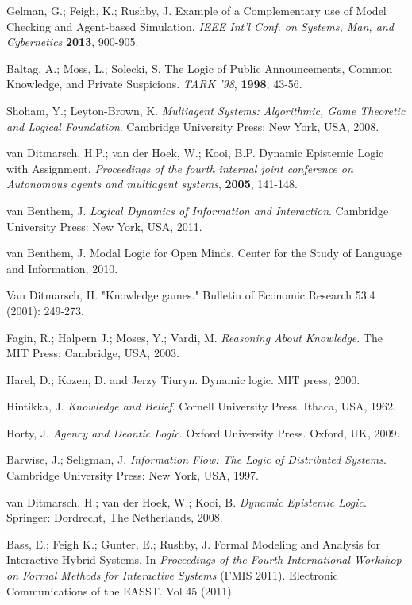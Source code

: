 \begin{thebibliography}{9}
	 	Gelman, G.; Feigh, K.; Rushby, J. Example of a Complementary use of Model Checking and Agent-based Simulation. {\em IEEE Int'l Conf. on Systems, Man, and Cybernetics} {\bf 2013}, 900-905.
	 	
	 	
	 	
	 	Baltag, A.; Moss, L.; Solecki, S. The Logic of Public Announcements, Common Knowledge, and Private Suspicions. {\em TARK '98}, {\bf 1998}, 43-56.
	 	
	 	Shoham, Y.; Leyton-Brown, K. {\em Multiagent Systems: Algorithmic, Game Theoretic and Logical Foundation}. Cambridge University Press: New York, USA, 2008.
	 	
	 	van Ditmarsch, H.P.; van der Hoek, W.; Kooi, B.P. Dynamic Epistemic Logic with Assignment. {\em Proceedings of the fourth internal joint conference on Autonomous agents and multiagent systems}, {\bf 2005}, 141-148.
	 	
	 	van Benthem, J. {\em Logical Dynamics of Information and Interaction}. Cambridge University Press: New York, USA, 2011.
	 	
	 	van Benthem, J. Modal Logic for Open Minds. Center for the Study of Language and Information, 2010.
	 	
	 	Van Ditmarsch, H. "Knowledge games." Bulletin of Economic Research 53.4 (2001): 249-273.
	 	
	 	Fagin, R.; Halpern J.; Moses, Y.; Vardi, M. {\em Reasoning About Knowledge}. The MIT Press: Cambridge, USA, 2003.
	 	
	 	Harel, D.; Kozen, D. and Jerzy Tiuryn. Dynamic logic. MIT press, 2000.
	 	
	 	Hintikka, J. {\em Knowledge and Belief}. Cornell University Press. Ithaca, USA, 1962.
	 	
	 	Horty, J. {\em Agency and Deontic Logic}. Oxford University Press. Oxford, UK, 2009.
	 	
	 	Barwise, J.; Seligman, J. {\em Information Flow: The Logic of Distributed Systems}. Cambridge University Press: New York, USA, 1997.
	 	
	 	van Ditmarsch, H.; van der Hoek, W.; Kooi, B. {\em Dynamic Epistemic Logic}. Springer: Dordrecht, The Netherlands, 2008.
	 	
	 	 Bass, E.; Feigh K.; Gunter, E.; Rushby, J. Formal Modeling and Analysis for Interactive Hybrid Systems. In {\em Proceedings of the Fourth International Workshop on Formal Methods for Interactive Systems} (FMIS 2011). Electronic Communications of the EASST. Vol 45 (2011).
	 	

\end{thebibliography}
